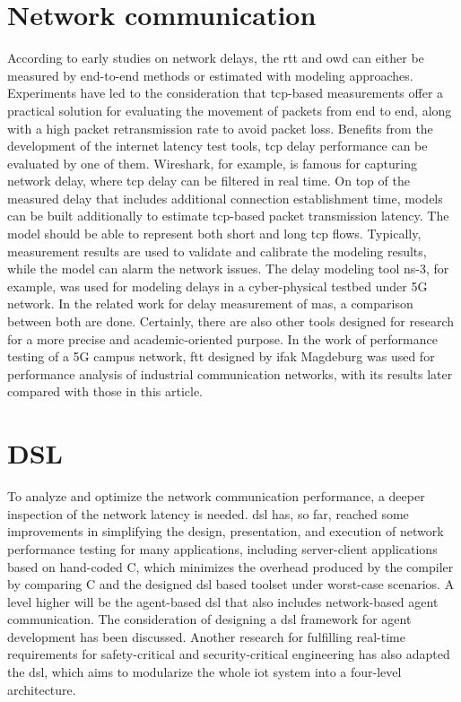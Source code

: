 \section{Network communication}
According to early studies on network delays, the \gls{rtt} and \gls{owd} 
can either be measured by end-to-end methods or estimated with modeling 
approaches. Experiments have led to the consideration that \gls{tcp}-based 
measurements offer a practical solution for evaluating the movement of 
packets from end to end, along with a high packet retransmission rate 
to avoid packet loss\cite{paxson_end--end_1999}. Benefits from 
the development of the internet latency test tools, \gls{tcp} delay 
performance can be evaluated by one of them. Wireshark, for example, is famous 
for capturing network delay, where \gls{tcp} delay can be filtered in real 
time\cite{dsouza_transmission_2020}.
On top of the measured delay 
that includes additional connection establishment time, 
models can be built additionally to estimate 
\gls{tcp}-based packet transmission latency. The model should be able to 
represent both short and long \gls{tcp} flows\cite{luan_estimating_2019}. 
Typically, measurement results are used to validate and calibrate the modeling 
results, while the model can alarm the network issues. The delay modeling tool 
ns-3, for example, was used for modeling delays in a cyber-physical 
testbed under 5G network\cite{adrah_real-time_2022}.
In the related work 
for delay measurement of \gls{mas}, a comparison between both are done\cite{vogel-heuser_delay_2023}.
Certainly, there are also other tools designed for research for a more 
precise and academic-oriented purpose. In the work of performance testing 
of a 5G campus network, \gls{ftt} designed by ifak Magdeburg was used 
for performance analysis of industrial communication networks\cite{cainelli_performance_2023}, 
with its results later compared with those in this article.



\section{DSL}
To analyze and optimize the network communication performance, a deeper 
inspection of the network latency is needed. \gls{dsl} has, so far, reached 
some improvements in simplifying the design, presentation, and execution of 
network performance testing for many applications, including server-client applications 
based on hand-coded C, which minimizes the overhead produced by the compiler by 
comparing C and the designed \gls{dsl} based toolset under worst-case scenarios.
A level higher will be the agent-based \gls{dsl} that also includes network-based 
agent communication. The consideration of designing a \gls{dsl} framework 
for agent development has been discussed\cite{judith_domain_2013}. Another 
research for fulfilling real-time requirements for safety-critical and 
security-critical engineering has also adapted the \gls{dsl}, which aims to 
modularize the whole \gls{iot} system into a four-level architecture\cite{sklyar_domain_2022}. 



